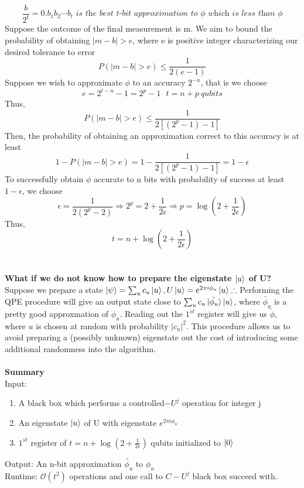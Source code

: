 \documentclass[]{article}
\theoremstyle{nonumberplain}
\begin{document}
\[
\frac{b}{2^{t}} = 0.b_{1}b_{2}\cdots b_{t} \textit{ is the best t-bit approximation to } \phi \textit{ which is less than } \phi
\] 
Suppose the outcome of the final measurement is m. We aim to bound the probability of obtaining $|m-b|>e$, where e is positive integer characterizing our desired tolerance to error
\[
	P(|m-b|>e) \leq \frac{1}{2(e-1)}
\] 
Suppose we wish to approximate $\phi$ to an accuracy $2^{-n}$, that is we choose 
\[
e = 2^{t-n} -1  = 2^{p} -1 \ \ \ t=n+p\ qubits
\] 
Thus,
\[
	P(|m-b|>e) \leq \frac{1}{2[(2^{p}-1)-1]}
\] 
Then, the probability of obtaining an approximation correct to this accuracy is at least
\[
	1-P(|m-b|>e) = 1-\frac{1}{2[(2^{p}-1)-1]} = 1-\epsilon
\] 
To successfully obtain $\phi$ accurate to n bits with probability of success at least $1-\epsilon$, we choose
\[
	\epsilon = \frac{1}{2(2^{p}-2)} \Rightarrow 2^{p} = 2+\frac{1}{2\epsilon} \Rightarrow p = \log{\left(2+\frac{1}{2\epsilon}\right)}
\] 
Thus,
\[
	t=n+\log{\left(2+\frac{1}{2\epsilon}\right)}
\] 
\\
\\
\textbf{What if we do not know how to prepare the eigenstate $\ket{u}$ of U?} \\
Suppose we prepare a state $\ket{\psi}= \sum^{}_{u} c_{u}\ket{u}, U\ket{u}=e^{2\pi i \phi_{u}}\ket{u}\therefore$ Performing the QPE procedure will give an output state close to $ \sum^{}_{u} c_{u}\ket{\tilde{\phi_{u}}}\ket{u}$, where $\tilde{\phi_{n}}$ is a pretty good approxmation of $\phi_{u}$. Reading out the $1^{st}$ register will give us $\tilde{\phi}$, where  $u$ is chosen at random with probability $|c_{u}|^{2}$. This procedure allows us to avoid preparing a (possibly unknown) eigenstate out the cost of introducing some additional randomness into the algorithm.\\
\\
\textbf{Summary} \\
Input:
\begin{enumerate}
	\item A black box which performs a controlled$-U^{j}$ operation for integer j
	\item An eigenstate $\ket{u}$ of U with eigenstate $e^{2\pi i \phi_{u}}$ 
	\item $1^{st}$ register of $t=n+\log{\left(2+\frac{1}{2\epsilon}\right)}$ qubits initialized to $\ket{0}$
\end{enumerate}
Output: An n-bit approximation $\tilde{\phi_{u}}$ to $\phi_{u}$ \\
Runtime: $\mathcal{O}(t^{2})$ operations and one call to $C-U^{j}$ black box succeed with. \\
\end{document}
